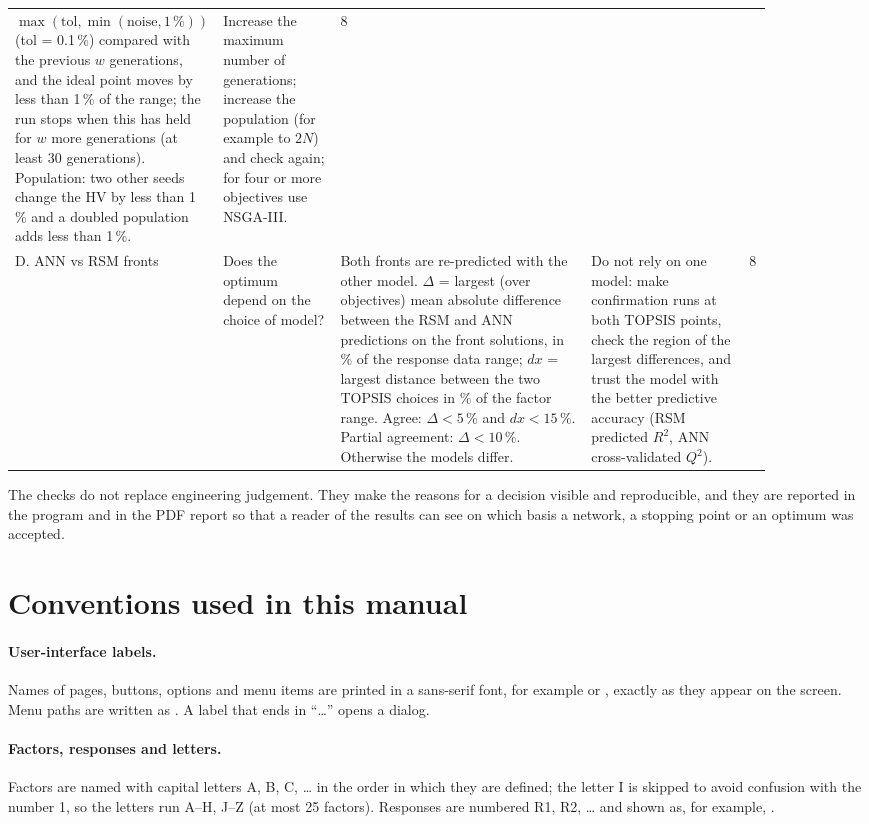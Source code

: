 {\begin{longtable}{@{}p{0.11\linewidth}p{0.16\linewidth}p{0.36\linewidth}p{0.22\linewidth}p{0.03\linewidth}@{}}
$\max(\mathrm{tol},\min(\mathrm{noise},1\,\%))$ (tol = 0.1\,\%) compared with the previous $w$ generations, and
the ideal point moves by less than 1\,\% of the range; the run stops when this has held for $w$ more generations
(at least 30 generations). Population: two other seeds change the HV by less than 1\,\% and a doubled population
adds less than 1\,\%. &
Increase the maximum number of generations; increase the population (for example to $2N$) and check again; for
four or more objectives use NSGA-III. & 8 \\
\addlinespace
D. ANN vs RSM fronts &
Does the optimum depend on the choice of model? &
Both fronts are re-predicted with the other model. $\Delta$ = largest (over objectives) mean absolute difference
between the RSM and ANN predictions on the front solutions, in \% of the response data range; $dx$ = largest
distance between the two TOPSIS choices in \% of the factor range. Agree: $\Delta<5\,\%$ and $dx<15\,\%$. Partial
agreement: $\Delta<10\,\%$. Otherwise the models differ. &
Do not rely on one model: make confirmation runs at both TOPSIS points, check the region of the largest
differences, and trust the model with the better predictive accuracy (RSM predicted $R^2$, ANN cross-validated
$Q^2$). & 8 \\
\end{longtable}}

The checks do not replace engineering judgement. They make the reasons for a decision visible and reproducible, and
they are reported in the program and in the PDF report so that a reader of the results can see on which basis a
network, a stopping point or an optimum was accepted.

\section{Conventions used in this manual}
\label{sec:ch01-conventions}

\paragraph{User-interface labels.} Names of pages, buttons, options and menu items are printed in a sans-serif font,
for example  or , exactly as they appear on the screen. Menu paths are written
as . A label that ends in ``\dots'' opens a dialog.

\paragraph{Factors, responses and letters.} Factors are named with capital letters A, B, C, \dots{} in the order in
which they are defined; the letter I is skipped to avoid confusion with the number 1, so the letters run A--H, J--Z
(at most 25 factors). Responses are numbered R1, R2, \dots{} and shown as, for example, .

